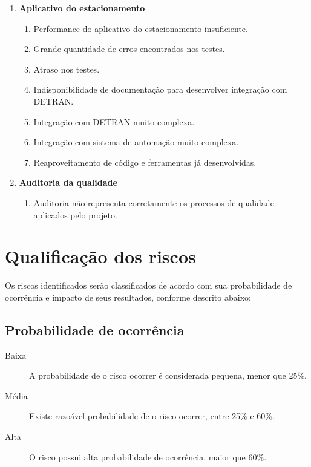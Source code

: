 \begin{description}
\begin{enumerate}[label=\arabic*.]
		\item \textbf{Aplicativo do estacionamento}
		      \begin{enumerate}[label*=\arabic*.]
			      \item Performance do aplicativo do estacionamento insuficiente.
			      \item Grande quantidade de erros encontrados nos testes.
			      \item Atraso nos testes.
			      \item Indisponibilidade de documentação para desenvolver integração com DETRAN.
			      \item Integração com DETRAN muito complexa.
			      \item Integração com sistema de automação muito complexa.
			      \item Reaproveitamento de código e ferramentas já desenvolvidas.
		      \end{enumerate}
		\item \textbf{Auditoria da qualidade}
		      \begin{enumerate}[label*=\arabic*.]
			      \item Auditoria não representa corretamente os processos de qualidade aplicados pelo projeto.
		      \end{enumerate}
	\end{enumerate}
\end{description}

\section{Qualificação dos riscos}
\label{sec:risk-qualification}

Os riscos identificados serão classificados de acordo com sua probabilidade de ocorrência e impacto de seus resultados, conforme descrito abaixo:

\subsection{Probabilidade de ocorrência}

\begin{description}
	\item [Baixa] A probabilidade de o risco ocorrer é considerada pequena, menor que 25\%.
	\item [Média] Existe razoável probabilidade de o risco ocorrer, entre 25\% e 60\%.
	\item [Alta] O risco possui alta probabilidade de ocorrência, maior que 60\%.
\end{description}

